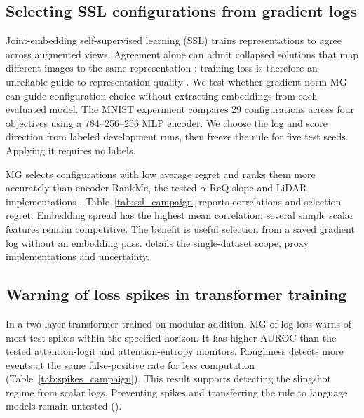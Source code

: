 \subsection{Selecting SSL configurations from gradient logs}\label{sec:ssl}
Joint-embedding self-supervised learning (SSL) trains representations to agree across augmented views. Agreement alone can admit collapsed solutions that map different images to the same representation \citep{chen2021simsiam}; training loss is therefore an unreliable guide to representation quality \citep{garrido2023rankme}. We test whether gradient-norm MG can guide configuration choice without extracting embeddings from each evaluated model. The MNIST experiment compares 29 configurations across four objectives using a 784--256--256 MLP encoder. We choose the log and score direction from labeled development runs, then freeze the rule for five test seeds. Applying it requires no labels.

MG selects configurations with low average regret and ranks them more accurately than encoder RankMe, the tested $\alpha$-ReQ slope and LiDAR implementations \citep{garrido2023rankme,agrawal2022alphareq,thilak2024lidar}. Table~\ref{tab:ssl_campaign} reports correlations and selection regret. Embedding spread has the highest mean correlation; several simple scalar features remain competitive. The benefit is useful selection from a saved gradient log without an embedding pass.  details the single-dataset scope, proxy implementations and uncertainty.

\subsection{Warning of loss spikes in transformer training}
In a two-layer transformer trained on modular addition, MG of log-loss warns of most test spikes within the specified horizon. It has higher AUROC than the tested attention-logit and attention-entropy monitors. Roughness detects more events at the same false-positive rate for less computation (Table~\ref{tab:spikes_campaign}). This result supports detecting the slingshot regime from scalar logs. Preventing spikes and transferring the rule to language models remain untested ().
